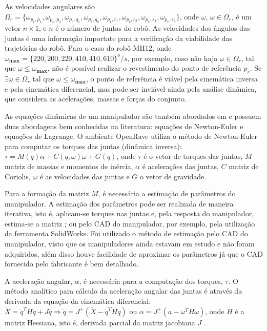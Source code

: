 As velocidades angulares são $\Omega_r
=
\{\omega_{p_r,p_1},\omega_{p_r,p_2},\omega_{p_r,q_1},\omega_{p_r,q_2},\omega_{p_r,r_1},\omega_{p_r,r_2},\omega_{p_r,s_1},\omega_{p_r,s_2}\}$,
onde $\omega$, $\omega\in\Omega_r$, é um vetor $n \times 1$, e $n$ é o número de
juntas do robô. As velocidades dos ângulos das juntas é uma informação importate para a
verificação da viabilidade das trajetórias do robô. Para o caso do robô
MH12, onde $\omega_{\textbf{max}}=\{220, 200, 220, 410, 410, 610\}^o/s$, por
exemplo, caso não haja $\omega\in\Omega_r$, tal que
$\omega\leq\omega_{\textbf{max}}$, não é possível realizar o revestimento do
ponto de referência $p_r$. Se $\exists \omega\in\Omega_r$ tal que
$\omega\leq\omega_{\textbf{max}}$, o ponto de referência é viável pela
cinemática inversa e pela cinemática diferencial, mas pode ser inviável ainda
pela análise dinâmica, que considera as acelerações, massas e forças do
conjunto.

As equações dinâmicas de um manipulador são também abordados em
\cite{sciavicco2000differential} e possuem duas abordagens bem conhecidas na
literatura: equações de Newton-Euler e equações de Lagrange. O ambiente OpenRave
utiliza o método de Newton-Euler para computar os torques das juntas (dinâmica
inversa): $\tau = M(q)\alpha + C(q,\omega)\omega + G(q) $, onde $\tau$ é o
vetor de torques das juntas, $M$ matriz de massas e momentos de inércia,
$\alpha$ é acelerações das juntas, $C$ matriz de Coriolis, $\omega$ é as
velocidades das juntas e $G$ o vetor de gravidade.

Para a formação da matriz $M$, é necessária a estimação de parâmetros do
manipulador. A estimação dos parâmetros pode ser realizada de maneira iterativa,
isto é, aplicam-se torques nas juntas e, pela resposta
do manipulador, estima-se a matriz \citep{slotine1988adaptive}; ou pelo CAD do
manipulador, por exemplo, pela utilização da ferramenta SolidWorks. Foi utilizado o método de estimação pelo CAD do
manipulador, visto que os manipuladores ainda estavam em estudo e não foram
adquiridos, além disso houve facilidade de aproximar os parâmetros já que o CAD
fornecido pelo fabricante é bem detalhado. 

A aceleração angular, $\alpha$, é necessária para a computação dos torques,
$\tau$. O método analítico para cálculo da aceleração angular das juntas é
através da derivada da equação da cinemática diferencial:
$\ddot{X}=\dot{q}^TH\dot{q}+J\ddot{q} \Rightarrow
\ddot{q}=J^+(\ddot{X}-\dot{q}^TH\dot{q})$ ou
$\alpha=J^+(a-\omega^TH\omega)$, onde $H$ é a matriz Hessiana, isto é, derivada
parcial da matriz jacobiana $J$ \citep{hourtash2005kinematic}. 

